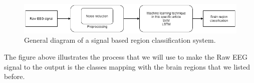     \begin{figure}[h]
        \centering
        \includegraphics[width=1\textwidth]{images/GeneralDiagram.png}
        \caption{General diagram of a signal based region classification system.}
    \end{figure}
    
    The figure above illustrates the process that we will use to make the Raw EEG signal to the output is the classes mapping with the brain regions that we listed before.